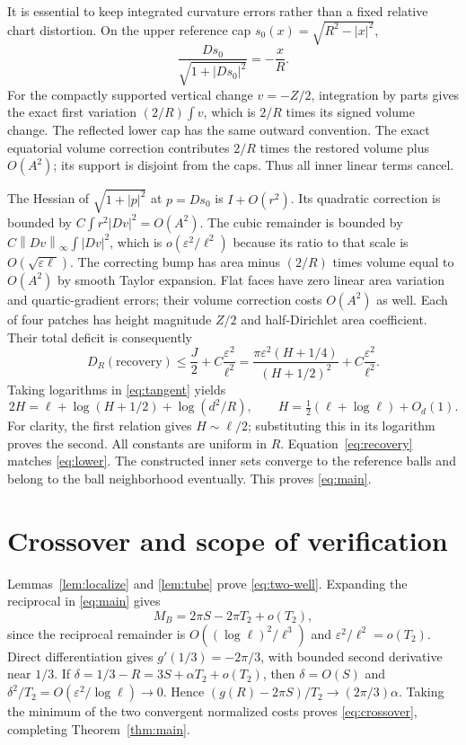 \documentclass[11pt]{article}
\newcommand{\eps}{\varepsilon}
\newcommand{\norm}[1]{\left\|#1\right\|}
\theoremstyle{remark}\newtheorem{remark}[theorem]{Remark}
\numberwithin{equation}{section}
\begin{document}
It is essential to keep integrated curvature errors rather than a fixed
relative chart distortion. On the upper reference cap
$s_0(x)=\sqrt{R^2-|x|^2}$,
\[
 \frac{Ds_0}{\sqrt{1+|Ds_0|^2}}=-\frac{x}{R}.
\]
For the compactly supported vertical change $v=-Z/2$, integration by
parts gives the exact first variation $(2/R)\int v$, which is $2/R$
times its signed volume change. The reflected lower cap has the same
outward convention. The exact equatorial volume correction contributes
$2/R$ times the restored volume plus $O(A^2)$; its support is disjoint
from the caps. Thus all inner linear terms cancel.

The Hessian of $\sqrt{1+|p|^2}$ at $p=Ds_0$ is $I+O(r^2)$.
Its quadratic correction is bounded by
$C\int r^2|Dv|^2=O(A^2)$. The cubic remainder is bounded by
$C\norm{Dv}_\infty\int|Dv|^2$, which is
$o(\eps^2/\ell^2)$ because its ratio to that scale is
$O(\sqrt{\eps\ell})$. The correcting bump has area minus
$(2/R)$ times volume equal to $O(A^2)$ by smooth Taylor expansion.
Flat faces have zero linear area variation and quartic-gradient errors;
their volume correction costs $O(A^2)$ as well.
Each of four patches has height magnitude $Z/2$ and half-Dirichlet area
coefficient. Their total deficit is consequently
\begin{equation}
 D_R(\text{recovery})\leq\frac J2+C\frac{\eps^2}{\ell^2}
 =\frac{\pi\eps^2(H+1/4)}{(H+1/2)^2}
       +C\frac{\eps^2}{\ell^2}.\label{eq:recovery}
\end{equation}
Taking logarithms in \eqref{eq:tangent} yields
\[
 2H=\ell+\log(H+1/2)+\log(d^2/R),\qquad
 H=\tfrac12(\ell+\log\ell)+O_d(1).
\]
For clarity, the first relation gives $H\sim\ell/2$; substituting this
in its logarithm proves the second. All constants are uniform in $R$.
Equation~\eqref{eq:recovery} matches \eqref{eq:lower}. The constructed
inner sets converge to the reference balls and belong to the ball
neighborhood eventually. This proves \eqref{eq:main}.

\section{Crossover and scope of verification}\label{sec:conclusion}
Lemmas~\ref{lem:localize} and \ref{lem:tube} prove
\eqref{eq:two-well}. Expanding the reciprocal in \eqref{eq:main} gives
\[
 M_B=2\pi S-2\pi T_2+o(T_2),
\]
since the reciprocal remainder is
$O((\log\ell)^2/\ell^3)$ and $\eps^2/\ell^2=o(T_2)$.
Direct differentiation gives $g'(1/3)=-2\pi/3$, with bounded second
derivative near $1/3$. If $\delta=1/3-R=3S+\alpha T_2+o(T_2)$,
then $\delta=O(S)$ and
$\delta^2/T_2=O(\eps^2/\log\ell)\to0$. Hence
$(g(R)-2\pi S)/T_2\to(2\pi/3)\alpha$.
Taking the minimum of the two convergent normalized costs proves
\eqref{eq:crossover}, completing Theorem~\ref{thm:main}.
\end{document}
